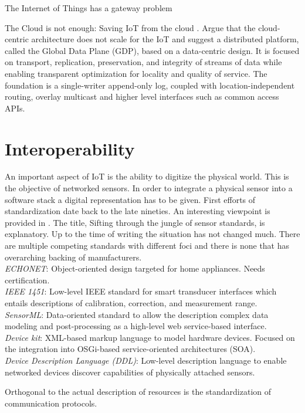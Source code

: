 The Internet of Things has a gateway problem \cite{Zachariah:2015:ITG:2699343.2699344}

The Cloud is not enough: Saving IoT from the cloud \cite{Zhang:2015}. Argue that the cloud-centric architecture does not scale for the IoT and suggest a distributed platform, called the Global Data Plane (GDP), based on a data-centric design. It is focused on transport, replication, preservation, and integrity of streams of data while enabling transparent optimization for locality and quality of service. The foundation is a single-writer append-only log, coupled with location-independent routing, overlay multicast and higher level interfaces such as common access APIs.


\section{Interoperability}

An important aspect of IoT is the ability to digitize the physical world. This is the objective of networked sensors. In order to integrate a physical sensor into a software stack a digital representation has to be given. First efforts of standardization date back to the late nineties. An interesting viewpoint is provided in \cite{Chen:2008}. The title, Sifting through the jungle of sensor standards, is explanatory. Up to the time of writing the situation has not changed much. There are multiple competing standards with different foci and there is none that has overarching backing of manufacturers. 
\\
\emph{ECHONET}: Object-oriented design targeted for home appliances. Needs certification.
\\
\emph{IEEE 1451}: Low-level IEEE standard for smart transducer interfaces which entails descriptions of calibration, correction, and measurement range.
\\
\emph{SensorML}: Data-oriented standard to allow the description complex data modeling and post-processing as a high-level web service-based interface.
\\
\emph{Device kit}: XML-based markup language to model hardware devices. Focused on the integration into OSGi-based service-oriented architectures (SOA).
\\
\emph{Device Description Language (DDL)}: Low-level description language to enable networked devices discover capabilities of physically attached sensors.

Orthogonal to the actual description of resources is the standardization of communication protocols. 

